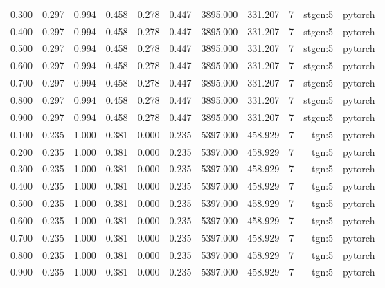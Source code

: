 \begin{tabular}{lrrrrrrrrrr}
0.300 & 0.297 & 0.994 & 0.458 & 0.278 & 0.447 & 3895.000 & 331.207 & 7 & stgcn:5 & pytorch \\
0.400 & 0.297 & 0.994 & 0.458 & 0.278 & 0.447 & 3895.000 & 331.207 & 7 & stgcn:5 & pytorch \\
0.500 & 0.297 & 0.994 & 0.458 & 0.278 & 0.447 & 3895.000 & 331.207 & 7 & stgcn:5 & pytorch \\
0.600 & 0.297 & 0.994 & 0.458 & 0.278 & 0.447 & 3895.000 & 331.207 & 7 & stgcn:5 & pytorch \\
0.700 & 0.297 & 0.994 & 0.458 & 0.278 & 0.447 & 3895.000 & 331.207 & 7 & stgcn:5 & pytorch \\
0.800 & 0.297 & 0.994 & 0.458 & 0.278 & 0.447 & 3895.000 & 331.207 & 7 & stgcn:5 & pytorch \\
0.900 & 0.297 & 0.994 & 0.458 & 0.278 & 0.447 & 3895.000 & 331.207 & 7 & stgcn:5 & pytorch \\
0.100 & 0.235 & 1.000 & 0.381 & 0.000 & 0.235 & 5397.000 & 458.929 & 7 & tgn:5 & pytorch \\
0.200 & 0.235 & 1.000 & 0.381 & 0.000 & 0.235 & 5397.000 & 458.929 & 7 & tgn:5 & pytorch \\
0.300 & 0.235 & 1.000 & 0.381 & 0.000 & 0.235 & 5397.000 & 458.929 & 7 & tgn:5 & pytorch \\
0.400 & 0.235 & 1.000 & 0.381 & 0.000 & 0.235 & 5397.000 & 458.929 & 7 & tgn:5 & pytorch \\
0.500 & 0.235 & 1.000 & 0.381 & 0.000 & 0.235 & 5397.000 & 458.929 & 7 & tgn:5 & pytorch \\
0.600 & 0.235 & 1.000 & 0.381 & 0.000 & 0.235 & 5397.000 & 458.929 & 7 & tgn:5 & pytorch \\
0.700 & 0.235 & 1.000 & 0.381 & 0.000 & 0.235 & 5397.000 & 458.929 & 7 & tgn:5 & pytorch \\
0.800 & 0.235 & 1.000 & 0.381 & 0.000 & 0.235 & 5397.000 & 458.929 & 7 & tgn:5 & pytorch \\
0.900 & 0.235 & 1.000 & 0.381 & 0.000 & 0.235 & 5397.000 & 458.929 & 7 & tgn:5 & pytorch \\
\bottomrule
\end{tabular}